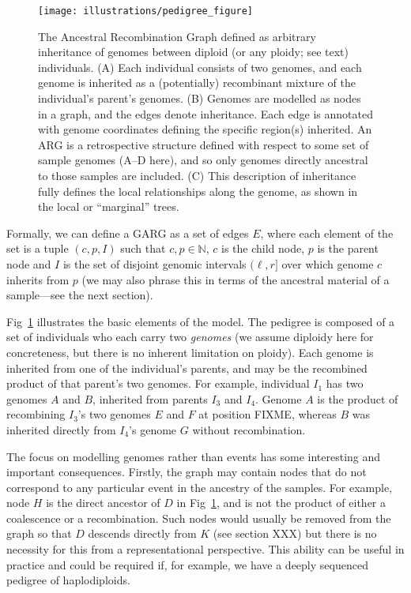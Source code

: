 \documentclass{article}
\begin{document}
\begin{figure}
    \texttt{[image: illustrations/pedigree\_figure]}
\caption{\label{fig-pedigree-and-arg}
The Ancestral Recombination Graph defined as arbitrary inheritance
of genomes between diploid (or any ploidy; see text) individuals.
(A) Each individual consists of two genomes, and each genome is
inherited as a (potentially) recombinant mixture of the individual's parent's
genomes. (B) Genomes are modelled as nodes in a graph, and the edges
denote inheritance. Each edge is annotated with genome coordinates
defining the specific region(s) inherited. An ARG is a retrospective
structure defined with
respect to some set of sample genomes (A--D here), and so only
genomes directly ancestral to those samples are included.
(C) This description of inheritance fully defines the
local relationships along the genome, as shown in the local
or ``marginal'' trees.
}
\end{figure}

Formally, we can define a GARG as a set of edges $E$, where each
element of the set is a tuple $(c, p, I)$ such that $c, p \in \mathbb{N}$,
$c$ is the child node, $p$ is the parent node and $I$ is the set of
disjoint genomic intervals $(\ell, r]$ over which genome $c$ inherits from $p$ (we may
also phrase this in terms of the ancestral material of a sample---see
the next section).

Fig~\ref{fig-pedigree-and-arg} illustrates the basic elements of the model.
The pedigree is composed of a set of individuals who each carry
two \emph{genomes} (we assume diploidy here for concreteness, but there
is no inherent limitation on ploidy).
Each genome is inherited from one of the individual's parents, and may
be the recombined product of that parent's two genomes.
For example, individual $I_1$ has two genomes $A$ and $B$,
inherited from parents $I_3$ and $I_4$. Genome $A$ is the product of
recombining $I_3$'s two genomes $E$ and $F$ at position FIXME,
whereas $B$ was inherited directly from $I_4$'s genome $G$ without
recombination.

The focus on modelling genomes rather than events has some interesting
and important consequences. Firstly, the graph may contain nodes that
do not correspond to any particular event in the ancestry of the
samples. For example, node $H$ is the direct ancestor of $D$ in
Fig~\ref{fig-pedigree-and-arg}, and is not the product of either a
coalescence or a recombination. Such nodes would usually be removed
from the graph so that $D$ descends directly from $K$ (see section XXX)
but there is no necessity for this from a representational perspective.
This ability can be useful in practice and could be required if,
for example, we have a deeply sequenced pedigree of
haplodiploids. %
\end{document}
